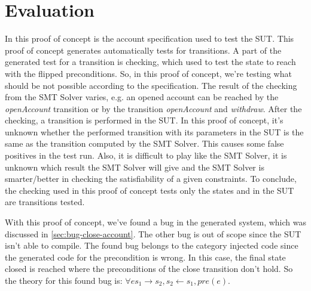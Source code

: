 \section{Evaluation}
\label{sec:ch4-evaluation}

In this proof of concept is the account specification used to test the SUT. This proof of concept generates automatically tests for transitions. A part of the generated test for a transition is checking, which used to test the state to reach with the flipped preconditions. So, in this proof of concept, we're testing what should be not possible according to the specification. The result of the checking from the SMT Solver varies, e.g. an opened account can be reached by the \textit{openAccount} transition or by the transition \textit{openAccount} and \textit{withdraw}. After the checking, a transition is performed in the SUT. In this proof of concept, it's unknown whether the performed transition with its parameters in the SUT is the same as the transition computed by the SMT Solver. This causes some false positives in the test run. Also, it is difficult to play like the SMT Solver, it is unknown which result the SMT Solver will give and the SMT Solver is smarter/better in checking the satisfiability of a given constraints. To conclude, the checking used in this proof of concept tests only the states and in the SUT are transitions tested. 

With this proof of concept, we've found a bug in the generated system, which was discussed in \autoref{sec:bug-close-account}. The other bug is out of scope since the SUT isn't able to compile. The found bug belongs to the category injected code since the generated code for the precondition is wrong. In this case, the final state closed is reached where the preconditions of the close transition don't hold. So the theory for this found bug is: $\forall e s_{1} \to s_{2}, s_{2} \gets s_{1}, pre(e)$.



